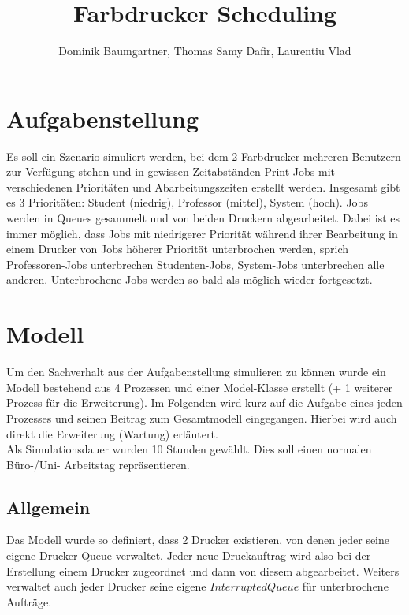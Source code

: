 \documentclass[12pt,a4paper]{article}
\title{Farbdrucker Scheduling}
\author{Dominik Baumgartner, Thomas Samy Dafir, Laurentiu Vlad}
\date{}
\begin{document}
	\maketitle
	
	\section{Aufgabenstellung}
	Es soll ein Szenario simuliert werden, bei dem 2 Farbdrucker mehreren Benutzern zur Verfügung stehen und in gewissen Zeitabständen Print-Jobs mit
	verschiedenen Prioritäten und Abarbeitungszeiten erstellt werden. Insgesamt gibt es 3 Prioritäten: Student (niedrig), Professor (mittel), System (hoch). Jobs
	werden in Queues gesammelt und von beiden Druckern abgearbeitet. Dabei ist es immer möglich, dass Jobs mit niedrigerer Priorität während ihrer Bearbeitung in 
	einem Drucker von Jobs höherer Priorität unterbrochen werden, sprich Professoren-Jobs unterbrechen Studenten-Jobs, System-Jobs unterbrechen alle 
	anderen. Unterbrochene Jobs werden so bald als möglich wieder fortgesetzt.
	
	\section{Modell}
	Um den Sachverhalt aus der Aufgabenstellung simulieren zu können wurde ein Modell bestehend aus 4 Prozessen und einer Model-Klasse erstellt (+ 1 weiterer Prozess für die Erweiterung).
	Im Folgenden wird kurz auf die Aufgabe eines jeden Prozesses und seinen Beitrag zum Gesamtmodell eingegangen. Hierbei wird auch direkt die Erweiterung (Wartung) erläutert. \\
	Als Simulationsdauer wurden 10 Stunden gewählt. Dies soll einen normalen Büro-/Uni- Arbeitstag repräsentieren.
	
	\subsection{Allgemein}
	Das Modell wurde so definiert, dass 2 Drucker existieren, von denen jeder seine eigene Drucker-Queue verwaltet. Jeder neue Druckauftrag wird also bei der Erstellung einem Drucker zugeordnet
	und dann von diesem abgearbeitet. Weiters verwaltet auch jeder Drucker seine eigene $InterruptedQueue$ für unterbrochene Aufträge.
	
\end{document}
